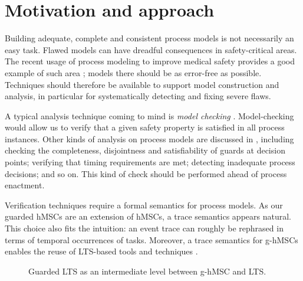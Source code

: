 \section{Motivation and approach\label{section:deductive-motivation}}

Building adequate, complete and consistent process models is not necessarily an easy task. Flawed models can have dreadful consequences in safety-critical areas. The recent usage of process modeling to improve medical safety provides a good example of such area \cite{Clarke:2008, Grando:2009, Damas:2011}; models there should be as error-free as possible. Techniques should therefore be available to support model construction and analysis, in particular for systematically detecting and fixing severe flaws.

A typical analysis technique coming to mind is \emph{model checking} \cite{Clarke:1989}. Model-checking would allow us to verify that a given safety property is satisfied in all process instances. Other kinds of analysis on process models are discussed in \cite{Damas:2011}, including checking the completeness, disjointness and satisfiability of guards at decision points; verifying that timing requirements are met; detecting inadequate process decisions; and so on. This kind of check should be performed ahead of process enactment.

Verification techniques require a formal semantics for process models. As our guarded hMSCs are an extension of hMSCs, a trace semantics appears natural. This choice also fits the intuition: an event trace can roughly be rephrased in terms of temporal occurrences of tasks. Moreover, a trace semantics for g-hMSCs enables the reuse of LTS-based tools and techniques \cite{Magee:1999, Giannakopoulou:2003}.

\begin{figure}\centering
{}
\caption{Guarded LTS as an intermediate level between g-hMSC and LTS.\label{image:deductive-chapter-overview}}
\end{figure}

